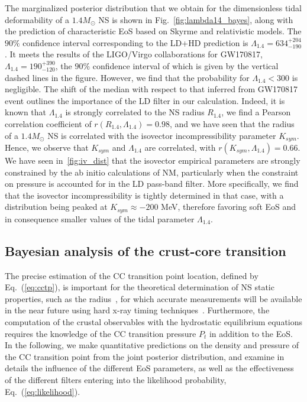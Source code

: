 The marginalized posterior distribution that we obtain for the dimensionless 
tidal deformability of a $1.4M_\odot$ NS is shown in 
Fig.~\ref{fig:lambda14_bayes}, along with the prediction of characteristic EoS
based on Skyrme and relativistic models. The $90\%$ confidence interval
corresponding to the LD+HD prediction is $\Lambda_{1.4}=634_{-190}^{+204}$. It 
meets the results of the LIGO/Virgo collaborations for GW170817, 
$\Lambda_{1.4}=190_{-120}^{+390}$, the $90\%$ confidence interval of which is 
given by the vertical dashed lines in the figure. 
However, we find that the probability for $\Lambda_{1.4} < 300$ is 
negligible. The shift of the median with respect to that inferred from
GW170817 event outlines the importance of the LD filter in our calculation.
Indeed, it is known that $\Lambda_{1.4}$ is strongly correlated to the NS
radius $R_{1.4}$, we find a Pearson correlation coefficient of $r(R_{1.4},
\Lambda_{1.4})=0.98$, and we have seen that the radius of a $1.4M_\odot$ NS is 
correlated with the isovector incompressibility parameter $K_{sym}$. Hence, 
we observe that $K_{sym}$ and $\Lambda_{1.4}$ are correlated, with
$r(K_{sym},\Lambda_{1.4}) = 0.66$. We have seen in~\ref{fig:iv_dist} that the 
isovector empirical parameters are strongly constrained by the ab initio 
calculations of NM, particularly when the constraint on pressure is accounted 
for in the LD pass-band filter. More specifically, we find that the 
isovector incompressibility is tightly determined in that case, with a 
distribution being peaked at $K_{sym} \approx -200$ MeV, therefore favoring 
soft EoS and in consequence smaller values of the tidal parameter 
$\Lambda_{1.4}$.

\subsection{Bayesian analysis of the crust-core
transition}\label{subsec:cc_bayes}

The precise estimation of the CC transition point location, defined by
Eq.~(\ref{eq:cctp}), is important for the theoretical determination of NS 
static properties, such as the radius~\cite{Fortin2016}, for which accurate 
measurements will be available in the near future using hard x-ray timing 
techniques~\cite{Watts2016}. 
Furthermore, the computation of the crustal observables with the hydrostatic 
equilibrium equations requires the knowledge of the CC transition pressure 
$P_t$ in addition to the EoS. 
In the following, we make quantitative predictions on the density and
pressure of the CC transition point from the joint posterior distribution, and 
examine in details the influence of the different EoS parameters, as well as 
the effectiveness of the different filters entering into the likelihood 
probability, Eq.~(\ref{eq:likelihood}).

